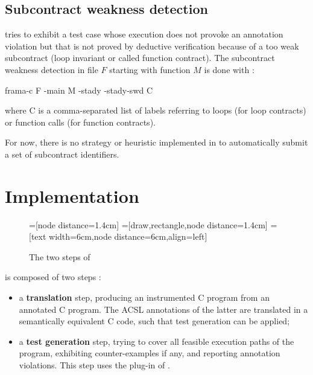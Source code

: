 \documentclass[web]{frama-c-book}
\begin{document}
\section{Subcontract weakness detection}

\stady tries to exhibit a test case whose execution does not provoke an annotation violation but that is not proved by deductive verification because of a too weak subcontract (loop invariant or called function contract). The subcontract weakness detection in file $F$ starting with function $M$ is done with :

\begin{shell}
  frama-c F -main M -stady -stady-swd C
\end{shell}

where C is a comma-separated list of labels referring to loops (for loop contracts) or function calls (for function contracts).

For now, there is no strategy or heuristic implemented in \stady to automatically submit a set of subcontract identifiers.


\chapter{Implementation}


\begin{figure}\centering
  =[node distance=1.4cm]
  =[draw,rectangle,node distance=1.4cm]
  =[text width=6cm,node distance=6cm,align=left]
  \caption{The two steps of \stady\label{fig:stady-steps}}
\end{figure}

\stady is composed of two steps :
\begin{itemize}
\item a \textbf{translation} step, producing an instrumented C program from an annotated C program. The ACSL annotations of the latter are translated in a semantically equivalent C code, such that test generation can be applied;

\item a \textbf{test generation} step, trying to cover all feasible execution paths of the program, exhibiting counter-examples if any, and reporting annotation violations. This step uses the \pathcrawler plug-in of \framac.
\end{itemize}
\end{document}
